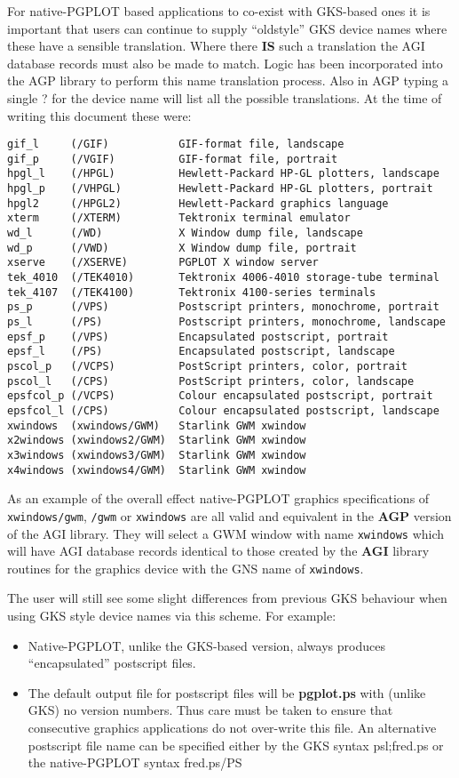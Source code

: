 \documentclass[twoside,11pt]{article}
\renewcommand{\_}{\texttt{\symbol{95}}}
\begin{document}
For native-PGPLOT based applications to co-exist with GKS-based ones
it is important that users can continue to supply ``old\_style'' GKS device
names where these have a sensible translation. Where there \textbf{IS} such
a translation the AGI  database records must also be made to match. 
Logic has been incorporated into the AGP library to perform this name
translation process.
Also in AGP typing a single ? for the device name will list all the possible
translations. At 
the time of writing this document these were:
\begin{verbatim}
gif_l     (/GIF)           GIF-format file, landscape
gif_p     (/VGIF)          GIF-format file, portrait
hpgl_l    (/HPGL)          Hewlett-Packard HP-GL plotters, landscape
hpgl_p    (/VHPGL)         Hewlett-Packard HP-GL plotters, portrait
hpgl2     (/HPGL2)         Hewlett-Packard graphics language
xterm     (/XTERM)         Tektronix terminal emulator
wd_l      (/WD)            X Window dump file, landscape
wd_p      (/VWD)           X Window dump file, portrait
xserve    (/XSERVE)        PGPLOT X window server
tek_4010  (/TEK4010)       Tektronix 4006-4010 storage-tube terminal
tek_4107  (/TEK4100)       Tektronix 4100-series terminals
ps_p      (/VPS)           Postscript printers, monochrome, portrait
ps_l      (/PS)            Postscript printers, monochrome, landscape
epsf_p    (/VPS)           Encapsulated postscript, portrait
epsf_l    (/PS)            Encapsulated postscript, landscape
pscol_p   (/VCPS)          PostScript printers, color, portrait
pscol_l   (/CPS)           PostScript printers, color, landscape
epsfcol_p (/VCPS)          Colour encapsulated postscript, portrait
epsfcol_l (/CPS)           Colour encapsulated postscript, landscape
xwindows  (xwindows/GWM)   Starlink GWM xwindow
x2windows (xwindows2/GWM)  Starlink GWM xwindow
x3windows (xwindows3/GWM)  Starlink GWM xwindow
x4windows (xwindows4/GWM)  Starlink GWM xwindow
\end{verbatim}

As an example of the overall effect native-PGPLOT graphics
specifications of {\tt xwindows/gwm}, {\tt \//gwm} or {\tt xwindows}
are all valid and equivalent in the {\bf AGP} version of the AGI
library. They will select a GWM window with name {\tt xwindows} which
will have AGI database records identical to those created by the {\bf
AGI} library routines for the graphics device with the GNS name of
{\tt xwindows}.

The user will still see some slight differences from previous GKS behaviour 
when using GKS style device names via this scheme. For example:
\begin{itemize}
\item Native-PGPLOT, unlike the GKS-based version, always produces 
``encapsulated'' postscript files.
\item The default output file for postscript files will be \textbf{pgplot.ps} 
with (unlike GKS) no version numbers.  Thus care must be taken to ensure
that consecutive graphics applications do not over-write this file. An 
alternative postscript file name can be specified either by the GKS 
syntax ps\_l;fred.ps or the native-PGPLOT syntax fred.ps/PS
\end{itemize} 
\end{document}

